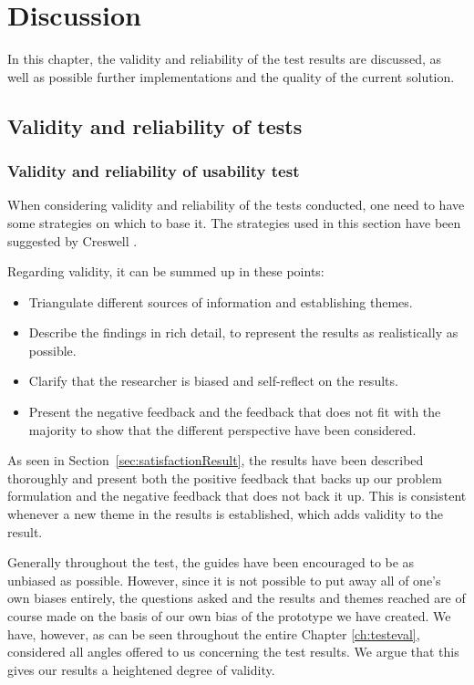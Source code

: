 \chapter{Discussion}\label{ch:discussion}
In this chapter, the validity and reliability of the test results are discussed, as well as possible further implementations and the quality of the current solution.

\section{Validity and reliability of tests}

\subsection{Validity and reliability of usability test}
When considering validity and reliability of the tests conducted, one need to have some strategies on which to base it. The strategies used in this section have been suggested by Creswell \citep{Creswell}.

Regarding validity, it can be summed up in these points:
\begin{itemize}
\item Triangulate different sources of information and establishing themes.
\item Describe the findings in rich detail, to represent the results as realistically as possible.
\item Clarify that the researcher is biased and self-reflect on the results.
\item Present the negative feedback and the feedback that does not fit with the majority to show that the different perspective have been considered.
\end{itemize}

As seen in Section~\ref{sec:satisfactionResult}, the results have been described thoroughly and present both the positive feedback that backs up our problem formulation and the negative feedback that does not back it up. This is consistent whenever a new theme in the results is established, which adds validity to the result. 

Generally throughout the test, the guides have been encouraged to be as unbiased as possible. However, since it is not possible to put away all of one's own biases entirely, the questions asked and the results and themes reached are of course made on the basis of our own bias of the prototype we have created. We have, however, as can be seen throughout the entire Chapter \ref{ch:testeval}, considered all angles offered to us concerning the test results. We argue that this gives our results a heightened degree of validity. 

